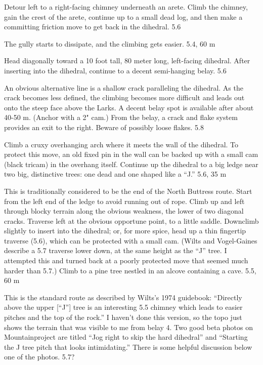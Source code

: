\documentclass{tahquitz}
\begin{document}
  Detour left to a right-facing chimney underneath an arete.
Climb the chimney, gain the crest of the arete, continue up
to a small dead log, and then make a committing friction
move to get back in the dihedral. 5.6

 The gully starts to dissipate, and the climbing gets easier.
5.4, 60 m

 Head diagonally toward a 10 foot tall, 80 meter long, left-facing dihedral. After
inserting into the dihedral, continue to a decent semi-hanging belay. 5.6

 An obvious alternative line is a shallow crack paralleling the dihedral.
As the crack becomes less defined,
the climbing becomes more difficult and leads out onto the steep face above the Larks.
A decent belay spot is available after about 40-50 m. (Anchor with a 2" cam.)
From the belay, a crack and flake system provides an exit to the right. 
Beware of possibly loose flakes. 5.8

 Climb a cruxy overhanging arch where it meets the wall of the dihedral.
To protect this move, an old fixed pin in the wall can be backed up with
a small cam (black tricam) in the overhang itself.
Continue up the dihedral to a big ledge near two big, distinctive
trees: one dead and one shaped like a ``J.'' 5.6, 35 m


 This is traditionally considered to be the end of the
North Buttress route. Start from the left end of the ledge to avoid
running out of rope. Climb up and left through blocky terrain along the obvious weakness, the
lower of two diagonal cracks. Traverse left at the obvious opportune point, to a
little saddle. Downclimb slightly to insert into the dihedral; or, for more spice,
head up a thin fingertip traverse (5.6),
which can be protected with a small cam. (Wilts and Vogel-Gaines describe a 5.7 traverse lower
down, at the same height as the ``J'' tree. I attempted this and turned back at a poorly
protected move that seemed much harder than 5.7.)
Climb to a pine tree nestled in an alcove containing a cave. 5.5, 60 m

 This is the standard route as described by Wilts's 1974 guidebook:
``Directly above the upper [``J''] tree is an interesting 5.5 chimney which leads
to easier pitches and the top of the rock.''
I haven't done this version, so the topo just shows the terrain that was visible
to me from belay 4. Two good beta
photos on Mountainproject are titled ``Jog right to skip the hard dihedral''
and ``Starting the J tree pitch that looks intimidating.''
There is some helpful discussion below one of the photos. 5.7?
\end{document}
